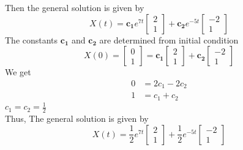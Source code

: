 \documentclass[]{article}
\begin{document}
\begin{example}
    \begin{comment}
    \begin{align*}
        \begin{bmatrix}
            1 & 12 \\
            3 & 1
        \end{bmatrix}
        \begin{bmatrix}
            v_1 \\v_2
        \end{bmatrix}
        =
        \begin{bmatrix}
            v_1 + 12v_2 \\
            3v_1 + v_2
        \end{bmatrix}
        =
        -5\begin{bmatrix}
              v_1 \\v_2
          \end{bmatrix}
        =
        \begin{bmatrix}
            -5v_1 \\-5v_2
        \end{bmatrix}
    \end{align*}
    \end{comment}
    Then the general solution is given by
    \[
        X(t) =\mathbf{c_1} e^{7t}\begin{bmatrix}
            2 \\1
        \end{bmatrix}
        + \mathbf{c_2}e^{-5t}\begin{bmatrix}
            -2 \\1
        \end{bmatrix}
    \]
    The constants $\mathbf{c_1}$ and $\mathbf{c_2}$ are determined from initial condition
    \[
        X(0) =\begin{bmatrix}
            0 \\1
        \end{bmatrix} =
        \mathbf{c_1} \begin{bmatrix}
            2 \\1
        \end{bmatrix}
        + \mathbf{c_2}\begin{bmatrix}
            -2 \\1
        \end{bmatrix}
    \]
    We get
    \begin{align*}
        0 & = 2c_1 - 2 c_2 \\
        1 & = c_1 + c_2
    \end{align*}
    $c_1 =  c_2 = \frac{1}{2}$\\

    Thus, The general solution is given by
    \[
        X(t) =\frac{1}{2} e^{7t}\begin{bmatrix}
            2 \\1
        \end{bmatrix}
        +\frac{1}{2}e^{-5t}\begin{bmatrix}
            -2 \\1
        \end{bmatrix}
    \]

\end{example}
\end{document}
